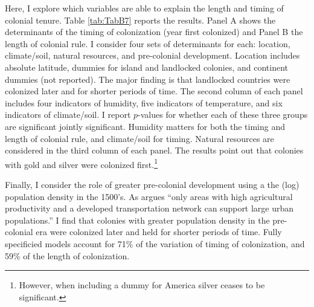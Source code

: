 \documentclass[a4paper,12pt]{article}
\begin{document}
\justifying 
\doublespacing
Here, I explore which variables are able to explain the length and timing of colonial tenure. Table \ref{tab:TabB7} reports the results. Panel A shows the determinants of the timing of colonization (year first colonized) and Panel B the length of colonial rule. I consider four sets of determinants for each: location, climate/soil, natural resources, and pre-colonial development. Location includes absolute latitude, dummies for island and landlocked colonies, and continent dummies (not reported). The major finding is that landlocked countries were colonized later and for shorter periods of time. The second column of each panel includes four indicators of humidity, five indicators of temperature, and six indicators of climate/soil. I report $p$-values for whether each of these three groups are significant jointly significant. Humidity matters for both the timing and length of colonial rule, and climate/soil for timing. Natural resources are considered in the third column of each panel. The results point out that colonies with gold and silver were colonized first.\footnote{However, when including a dummy for America silver ceases to be significant.} 

Finally, I consider the role of greater pre-colonial development using a the (log) population density in the 1500's. As \citet[p. 1232]{acemoglu2002reversal} argues ``only areas with high agricultural productivity and a developed transportation network can support large urban populations.'' I find that colonies with greater population density in the pre-colonial era were colonized later and held for shorter periods of time. Fully specificied models account for 71\% of the variation of timing of colonization, and 59\% of the length of colonization. 

\clearpage


\end{document}
